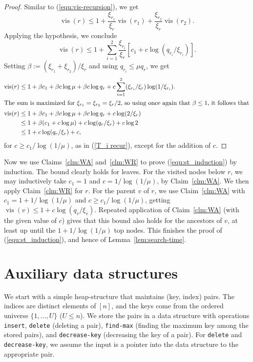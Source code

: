 \documentclass[letterpaper,11pt]{article}
\DeclareMathOperator{\vis}{vis}
\begin{document}
\begin{proof}
Similar to (\ref{equ:vis-recursion}), 
we get
\[
  \vis(r) \leq 
  1 + \frac{\xi_{r_1}}{\xi_r}\vis(r_1) + \frac{\xi_{r_2}}{\xi_r}\vis(r_2).
\]
Applying the hypothesis, 
we conclude
\[
\vis(r) \leq 
  1 + \sum_{i=1}^2 \frac{\xi_{r_i}}{\xi_r}[c_1 + c\log (q_{r_i}/\xi_{r_i})].
\]
Setting $\beta := (\xi_{r_1} + \xi_{r_2})/\xi_r$ 
and using $q_{r_i}\le \mu q_r$, we get 
\begin{align*}
  \vis(r) &\leq  
    1 + \beta c_1 + \beta c \log \mu  + \beta c \log q_r  
    + c \sum_{i=1}^2 (\xi_{r_i}/\xi_r)\log(1/\xi_{r_i}).\\
\intertext{The sum is 
  maximized for $\xi_{r_1} = \xi_{r_2} = \xi_r/2$, 
  so using once again that $\beta \leq 1$, it follows that}
  \vis(r) &\leq 
  1 + \beta c_1 + \beta c \log \mu  + \beta c \log q_r  + c \log(2/\xi_r)\\
  &\leq 
    1 + \beta(c_1 + c\log \mu ) + c\log(q_r/\xi_r) + c\log 2 \\
  &\leq 
    1 + c\log(q_r/\xi_r) + c,
\end{align*}
for $c \geq c_1/\log(1/\mu)$, 
as in (\ref{T_i recur}), except 
for the addition of $c$.
\end{proof}

Now we use Claims~\ref{clm:WA} 
and~\ref{clm:WR} to prove 
(\ref{equ:st_induction}) by induction. 
The bound clearly holds for leaves.
For the visited nodes
below $r$, we may inductively 
take $c_1 = 1$ and $c=1/\log(1/\mu)$, by 
Claim~\ref{clm:WA}.
We then apply Claim~\ref{clm:WR} for $r$.
For the parent $v$ of $r$, we 
use Claim~\ref{clm:WA} with
$c_1 = 1 + 1/\log(1/\mu)$ 
and $c\ge c_1/\log(1/\mu)$, getting
$\vis(v)\le 1 + c\log(q_v/\xi_v)$. 
Repeated application of Claim~\ref{clm:WA}  
(with the given value of $c$) gives 
that this bound also holds for the
ancestors of $v$, at least up until 
the $1+1/\log(1/\mu)$ top nodes. 
This finishes the proof of 
(\ref{equ:st_induction}), and 
hence of Lemma~\ref{lem:search-time}.




\section{Auxiliary data structures} \label{sec:data-str}

We start with a simple heap-structure 
that maintains (key, index) pairs.
The indices are distinct elements of 
$[n]$, and the keys come
from the ordered universe $\{1, \dots, U\}$ ($U \leq n$). 
We store the pairs in a data structure
with operations \texttt{insert}, 
\texttt{delete} (deleting a pair),
\texttt{find-max} (finding the maximum 
key among the stored pairs), and 
\texttt{decrease-key}
(decreasing the key of a pair). 
For \texttt{delete} and
\texttt{decrease-key}, we assume the input 
is a pointer into the
data structure to the appropriate pair.
\end{document}
